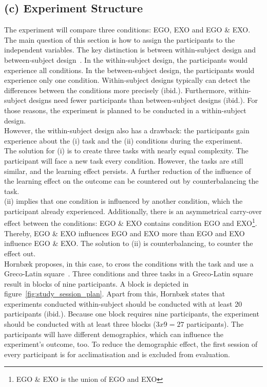 \subsection{(c) Experiment Structure}
\label{sec:studyStructure}
The experiment will compare three conditions: EGO, EXO and EGO \& EXO. The main question of this section is how to assign the participants to the independent variables. The key distinction is between within-subject design and between-subject design~\cite{hornbaek}. In the within-subject design, the participants would experience all conditions. In the between-subject design, the participants would experience only one condition. Within-subject designs typically can detect the differences between the conditions more precisely (ibid.). Furthermore, within-subject designs need fewer participants than between-subject designs (ibid.). For those reasons, the experiment is planned to be conducted in a within-subject design.\\
However, the within-subject design also has a drawback: the participants gain experience about the (i) task and the (ii) conditions during the experiment.\\

The solution for (i) is to create three tasks with nearly equal complexity. The participant will face a new task every condition. However, the tasks are still similar, and the learning effect persists. A further reduction of the influence of the learning effect on the outcome can be countered out by counterbalancing the task.\\

(ii) implies that one condition is influenced by another condition, which the participant already experienced. Additionally, there is an asymmetrical carry-over effect between the conditions: EGO \& EXO contains condition EGO and EXO\footnote{EGO \& EXO is the union of EGO and EXO}. Thereby, EGO \& EXO influences EGO and EXO more than EGO and EXO influence EGO \& EXO. The solution to (ii) is counterbalancing, to counter the effect out.\\

Hornb\ae{}k proposes, in this case, to cross the conditions with the task and use a Greco-Latin square~\cite{hornbaek}. Three conditions and three tasks in a Greco-Latin square result in blocks of nine participants. A block is depicted in figure~\ref{fig:study_session_plan}. Apart from this, Hornb\ae{}k states that experiments conducted within-subject should be conducted with at least 20 participants (ibid.). Because one block requires nine participants, the experiment should be conducted with at least three blocks ($3x9=27$ participants). 
The participants will have different demographics, which can influence the experiment's outcome, too. To reduce the demographic effect, the first session of every participant is for acclimatisation and is excluded from evaluation.

